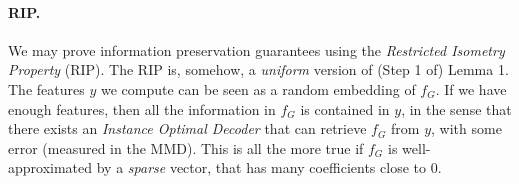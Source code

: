 \documentclass{article}
\begin{document}
%


\paragraph{RIP.} We may prove information preservation guarantees using the \emph{Restricted Isometry Property} (RIP). The RIP is, somehow, a \emph{uniform} version of (Step 1 of) Lemma 1. The features $y$ we compute can be seen as a random embedding of $f_G$. If we have enough features, then all the information in $f_G$ is contained in $y$, in the sense that there exists an \emph{Instance Optimal Decoder} that can retrieve $f_G$ from $y$, with some error (measured in the MMD). This is all the more true if $f_G$ is well-approximated by a \emph{sparse} vector, that has many coefficients close to $0$.
\end{document}
